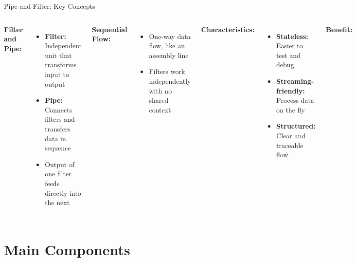 \documentclass[aspectratio=169, table]{beamer}
\begin{document}
\begin{frame}[fragile]{Pipe-and-Filter: Key Concepts}
	\vspace{20pt}
	\begin{columns}[T]
		\textbf{Filter and Pipe:}
		\begin{itemize}
			\item \textbf{Filter:} Independent unit that transforms input to output
			\item \textbf{Pipe:} Connects filters and transfers data in sequence
			\item Output of one filter feeds directly into the next
		\end{itemize}
		
		\textbf{Sequential Flow:}
		\begin{itemize}
			\item One-way data flow, like an assembly line
			\item Filters work independently with no shared context
		\end{itemize}
		
		\textbf{Characteristics:}
		\begin{itemize}
			\item \textbf{Stateless:} Easier to test and debug
			\item \textbf{Streaming-friendly:} Process data on the fly
			\item \textbf{Structured:} Clear and traceable flow
		\end{itemize}
		
		\textbf{Benefit:}
		\begin{itemize}
			\item Simplifies complex systems into modular steps
		\end{itemize}
	\end{columns}
\end{frame}

\section{Main Components}
\end{document}
